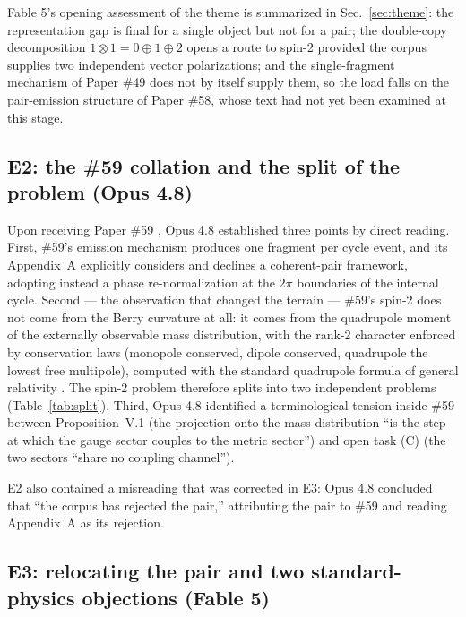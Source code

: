 \documentclass[%
 reprint, amsmath,amssymb, aps, prb, ]{revtex4-2}
\numberwithin{equation}{section}
\begin{document}
Fable 5's opening assessment of the theme is summarized in Sec.~\ref{sec:theme}: the representation gap is final for a single object but not for a pair; the double-copy decomposition $1\otimes1=0\oplus1\oplus2$ opens a route to spin-2 provided the corpus supplies two independent vector polarizations; and the single-fragment mechanism of Paper \#49 does not by itself supply them, so the load falls on the pair-emission structure of Paper \#58, whose text had not yet been examined at this stage.

\subsection{E2: the \#59 collation and the split of the problem (Opus 4.8)}

Upon receiving Paper \#59 \cite{hanamura59}, Opus 4.8 established three points by direct reading. First, \#59's emission mechanism produces one fragment per cycle event, and its Appendix~A explicitly considers and declines a coherent-pair framework, adopting instead a phase re-normalization at the $2\pi$ boundaries of the internal cycle. Second --- the observation that changed the terrain --- \#59's spin-2 does not come from the Berry curvature at all: it comes from the quadrupole moment of the externally observable mass distribution, with the rank-2 character enforced by conservation laws (monopole conserved, dipole conserved, quadrupole the lowest free multipole), computed with the standard quadrupole formula of general relativity \cite{peters}. The spin-2 problem therefore splits into two independent problems (Table~\ref{tab:split}). Third, Opus 4.8 identified a terminological tension inside \#59 between Proposition~V.1 (the projection onto the mass distribution ``is the step at which the gauge sector couples to the metric sector'') and open task (C) (the two sectors ``share no coupling channel'').

E2 also contained a misreading that was corrected in E3: Opus 4.8 concluded that ``the corpus has rejected the pair,'' attributing the pair to \#59 and reading Appendix~A as its rejection.

\subsection{E3: relocating the pair and two standard-physics objections (Fable 5)}
\end{document}
